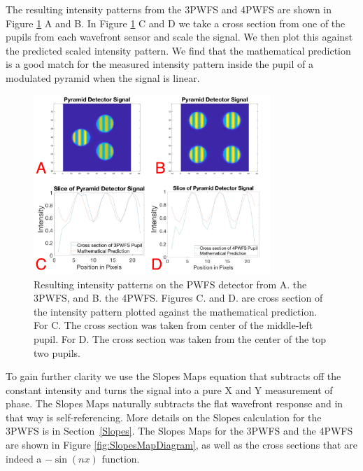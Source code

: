 The resulting intensity patterns from the 3PWFS and 4PWFS are shown in Figure \ref{fig:IntensityPatternsDiagram} A and B. In Figure \ref{fig:IntensityPatternsDiagram} C and D we take a cross section from one of the pupils from each wavefront sensor and scale the signal. We then plot this against the predicted scaled intensity pattern. We find that the mathematical prediction is a good match for the measured intensity pattern inside the pupil of a modulated pyramid when the signal is linear. 


\begin{figure}
    \centering
\includegraphics[width=0.8\textwidth]{Chapter Materials/Chapter Two Materials/IntensityPatternsDiagram.png}
    \caption{Resulting intensity patterns on the PWFS detector from A. the 3PWFS, and B. the 4PWFS. Figures C. and D. are cross section of the intensity pattern plotted against the mathematical prediction. For C. The cross section was taken from center of the middle-left pupil. For D. The cross section was taken from the center of the top two pupils.}
    \label{fig:IntensityPatternsDiagram}
\end{figure}

To gain further clarity we use the Slopes Maps equation that subtracts off the constant intensity and turns the signal into a pure X and Y measurement of phase. The Slopes Maps naturally subtracts the flat wavefront response and in that way is self-referencing.  More details on the Slopes calculation  for the 3PWFS is in Section~\ref{Slopes}. The Slopes Maps for the 3PWFS and the 4PWFS are shown in Figure \ref{fig:SlopesMapDiagram}, as well as the cross sections that are indeed a $-\sin(nx)$ function. 

